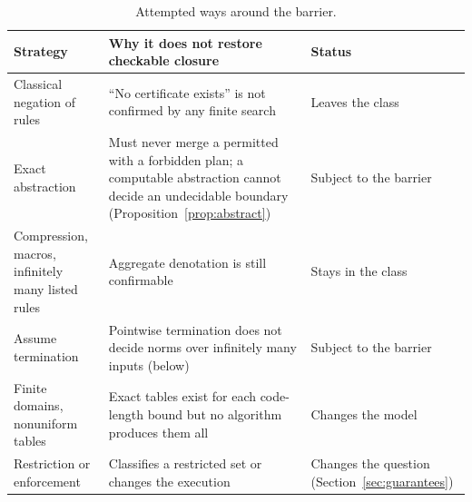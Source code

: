\begin{table}[h]
\centering\small
\caption{Attempted ways around the barrier.}
\label{tab:attempts}
\begin{tabularx}{\textwidth}{>{\raggedright\arraybackslash}p{3.6cm}Y>{\raggedright\arraybackslash}p{3.4cm}}
\toprule
Strategy & Why it does not restore checkable closure & Status\\
\midrule
Classical negation of rules & ``No certificate exists'' is not confirmed by any finite search & Leaves the class\\
Exact abstraction & Must never merge a permitted with a forbidden plan; a computable abstraction cannot decide an undecidable boundary (Proposition~\ref{prop:abstract}) & Subject to the barrier\\
Compression, macros, infinitely many listed rules & Aggregate denotation is still confirmable & Stays in the class\\
Assume termination & Pointwise termination does not decide norms over infinitely many inputs (below) & Subject to the barrier\\
Finite domains, nonuniform tables & Exact tables exist for each code-length bound but no algorithm produces them all & Changes the model\\
Restriction or enforcement & Classifies a restricted set or changes the execution & Changes the question (Section~\ref{sec:guarantees})\\
\bottomrule
\end{tabularx}
\end{table}
